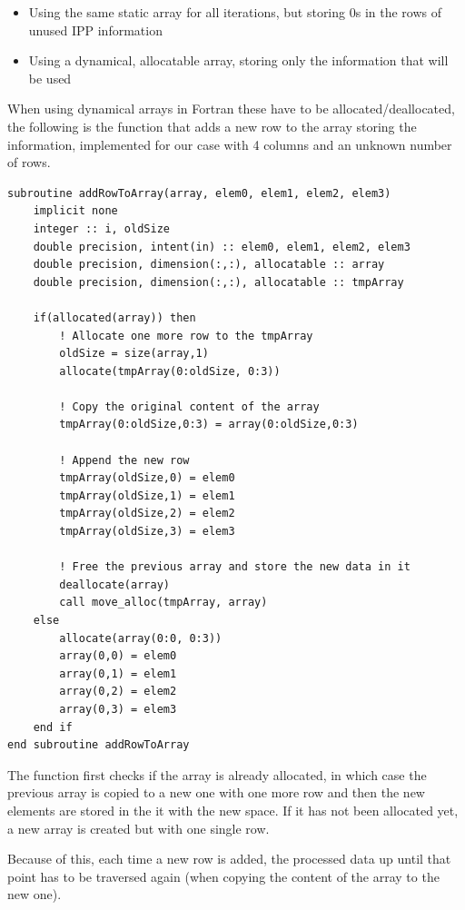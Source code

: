 \begin{itemize}
	\item Using the same static array for all iterations, but storing 0s in the rows of unused IPP information
	\item Using a dynamical, allocatable array, storing only the information that will be used
\end{itemize}

When using dynamical arrays in Fortran these have to be allocated/deallocated, the following is the function that adds a new row to the array storing the information, implemented for our case with 4 columns and an unknown number of rows.

\begin{minipage}{\linewidth}
\begin{lstlisting}[style=myFortranStyle, caption=Adding a new row to a two dimensional array]
subroutine addRowToArray(array, elem0, elem1, elem2, elem3)
	implicit none
	integer :: i, oldSize
	double precision, intent(in) :: elem0, elem1, elem2, elem3
	double precision, dimension(:,:), allocatable :: array
	double precision, dimension(:,:), allocatable :: tmpArray

	if(allocated(array)) then
		! Allocate one more row to the tmpArray
		oldSize = size(array,1)
		allocate(tmpArray(0:oldSize, 0:3)) 

		! Copy the original content of the array
		tmpArray(0:oldSize,0:3) = array(0:oldSize,0:3)

		! Append the new row
		tmpArray(oldSize,0) = elem0
		tmpArray(oldSize,1) = elem1
		tmpArray(oldSize,2) = elem2
		tmpArray(oldSize,3) = elem3

		! Free the previous array and store the new data in it
		deallocate(array)
		call move_alloc(tmpArray, array)
	else
		allocate(array(0:0, 0:3))
		array(0,0) = elem0
		array(0,1) = elem1
		array(0,2) = elem2
		array(0,3) = elem3
	end if
end subroutine addRowToArray\end{lstlisting}
\end{minipage}

The function first checks if the array is already allocated, in which case the previous array is copied to a new one with one more row and then the new elements are stored in the it with the new space. If it has not been allocated yet, a new array is created but with one single row.

Because of this, each time a new row is added, the processed data up until that point has to be traversed again (when copying the content of the array to the new one).

